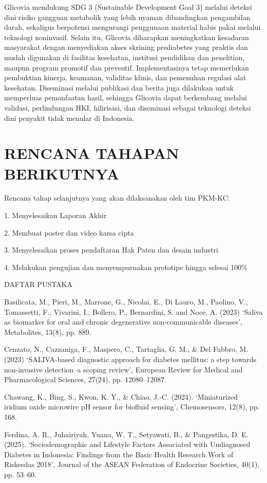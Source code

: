 \documentclass[a4paper,12pt]{article}
\begin{document}
Glicovia mendukung SDG 3 (Sustainable Development Goal 3) melalui deteksi dini risiko gangguan metabolik yang lebih nyaman dibandingkan pengambilan darah, sekaligus berpotensi mengurangi penggunaan material habis pakai melalui teknologi noninvasif. Selain itu, Glicovia diharapkan meningkatkan kesadaran masyarakat dengan menyediakan akses skrining prediabetes yang praktis dan mudah digunakan di fasilitas kesehatan, institusi pendidikan dan penelitian, maupun program promotif dan preventif. Implementasinya tetap memerlukan pembuktian kinerja, keamanan, validitas klinis, dan pemenuhan regulasi alat kesehatan. Diseminasi melalui publikasi dan berita juga dilakukan untuk memperluas pemanfaatan hasil, sehingga Glicovia dapat berkembang melalui validasi, perlindungan HKI, hilirisasi, dan diseminasi sebagai teknologi deteksi dini penyakit tidak menular di Indonesia.

\section{RENCANA TAHAPAN BERIKUTNYA}

Rencana tahap selanjutnya yang akan dilaksanakan oleh tim PKM-KC:

1.  Menyelesaikan Laporan Akhir

2.  Membuat poster dan video karsa cipta

3.  Menyelesaikan proses pendaftaran Hak Paten dan desain industri

4.  Melakukan pengujian dan menyempurnakan prototipe hingga selesai 100\%

DAFTAR PUSTAKA

Basilicata, M., Pieri, M., Marrone, G., Nicolai, E., Di Lauro, M., Paolino, V., Tomassetti, F., Vivarini, I., Bollero, P., Bernardini, S. and Noce, A. (2023) ‘Saliva as biomarker for oral and chronic degenerative non-communicable diseases’, Metabolites, 13(8), pp. 889.

Cenzato, N., Cazzaniga, F., Maspero, C., Tartaglia, G. M., \& Del Fabbro, M. (2023) ‘SALIVA-based diagnostic approach for diabetes mellitus: a step towards non-invasive detection–a scoping review’, European Review for Medical and Pharmacological Sciences, 27(24), pp. 12080–12087.

Chawang, K., Bing, S., Kwon, K. Y., \& Chiao, J.-C. (2024). ‘Miniaturized iridium oxide microwire pH sensor for biofluid sensing’, Chemosensors, 12(8), pp. 168.

Ferdina, A. R., Juhairiyah, Yuana, W. T., Setyawati, B., \& Pangestika, D. E. (2025). ‘Sociodemographic and Lifestyle Factors Associated with Undiagnosed Diabetes in Indonesia: Findings from the Basic Health Research Work of Riskesdas 2018’, Journal of the ASEAN Federation of Endocrine Societies, 40(1), pp. 53–60.
\end{document}
